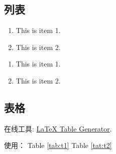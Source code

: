 \documentclass[twocolumn, twoside]{article}
\begin{document}
\subsection{列表}

\begin{enumerate}[1)]
\item This is item 1.
\item This is item 2.
\end{enumerate}

\begin{enumerate}[*]
\item This is item 1.
\item This is item 2.
\end{enumerate}

\subsection{表格}
在线工具: \href{http://www.tablesgenerator.com/}{LaTeX Table Generator}. 

使用： Table \ref{tab:t1} Table \ref{tat:t2}
\begin{table}[!htb] 
\centering
\caption{Style 1}
\label{tab:t1}
\end{table}


\begin{table}[!htb]
\centering
\caption{Style 2}
\label{tat:t2}
\end{table}
\blindtext
\end{document}
